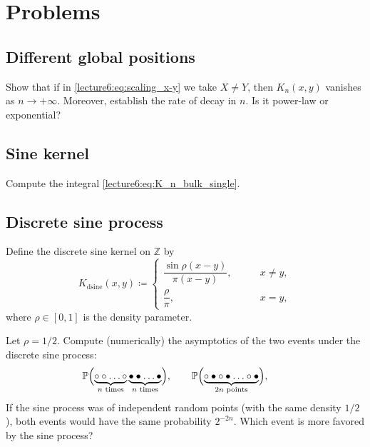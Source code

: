 \documentclass[letterpaper,11pt,oneside,reqno]{book}
\numberwithin{equation}{chapter}  %
\theoremstyle{definition}
\begin{document}
\section{Problems}

\subsection{Different global positions}
\label{lecture6:prob:different-global-positions}

Show that if in \eqref{lecture6:eq:scaling_x-y} we take $X\ne Y$, then
$K_n(x,y)$ vanishes as $n\to+\infty$. Moreover,
establish the rate of decay in $n$. Is it power-law or exponential?

\subsection{Sine kernel}
\label{lecture6:prob:sine-kernel}

Compute the integral
\eqref{lecture6:eq:K_n_bulk_single}.


\subsection{Discrete sine process}
\label{lecture6:prob:discrete-sine-process}

Define the discrete sine kernel on $\mathbb{Z}$ by
\begin{equation*}
	K_{\mathrm{dsine}}(x,y)\coloneqq
	\begin{cases}
		\dfrac{\sin \rho(x-y)}{\pi (x-y)},&\qquad x\ne y,\\[10pt]
		\dfrac{\rho}{\pi},&\qquad x=y,
	\end{cases}
\end{equation*}
where $\rho\in[0,1]$ is the density parameter.

Let $\rho=1/2$.
Compute (numerically) the asymptotics of the two events under the discrete sine process:
\begin{equation*}
	\operatorname{\mathbb{P}}
	\Bigl(
		\underbrace{\circ \circ\ldots\circ}_{n\text{ times}}
		\underbrace{\bullet \bullet\ldots\bullet}_{n\text{ times}}
	\Bigr),\qquad
	\operatorname{\mathbb{P}}
	\Bigl(
		\underbrace{\circ\bullet\circ\bullet\ldots\circ\bullet}_{2n\text{ points}}
	\Bigr),\qquad
\end{equation*}
If the sine process was of independent random points (with the same density $1/2$),
both events
would have the same probability $2^{-2n}$.
Which event is more favored by the sine process?
\end{document}

